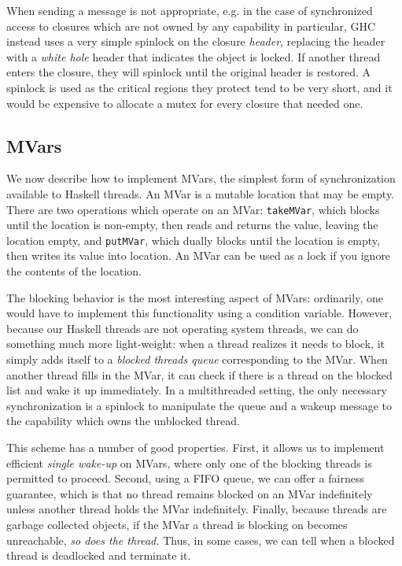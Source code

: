 When sending a message is not appropriate, e.g. in the case of
synchronized access to closures which are not owned by any capability in
particular, GHC instead uses a very simple spinlock on the closure
\emph{header}, replacing the header with a \emph{white hole} header that
indicates the object is locked.  If another thread enters the closure,
they will spinlock until the original header is restored.  A spinlock is
used as the critical regions they protect tend to be very short, and it would
be expensive to allocate a mutex for every closure that needed one.

\subsection{MVars}

We now describe how to implement MVars, the simplest form of
synchronization available to Haskell threads.  An MVar is a mutable
location that may be empty.  There are two operations which operate on
an MVar: \verb|takeMVar|, which blocks until the location is non-empty,
then reads and returns the value, leaving the location empty, and
\verb|putMVar|, which dually blocks until the location is empty, then
writes its value into location.  An MVar can be used as a lock if you
ignore the contents of the location.

The blocking behavior is the most interesting aspect of MVars:
ordinarily, one would have to implement this functionality using a
condition variable.  However, because our Haskell threads are not
operating system threads, we can do something much more light-weight:
when a thread realizes it needs to block, it simply adds itself to a
\emph{blocked threads queue} corresponding to the MVar.  When another
thread fills in the MVar, it can check if there is a thread on the
blocked list and wake it up immediately.  In a multithreaded setting,
the only necessary synchronization is a spinlock to manipulate the queue
and a wakeup message to the capability which owns the unblocked thread.

This scheme has a number of good properties.  First, it allows us
to implement efficient \emph{single wake-up} on MVars, where only one of
the blocking threads is permitted to proceed. Second, using a FIFO
queue, we can offer a fairness guarantee, which is that no thread
remains blocked on an MVar indefinitely unless another thread holds the
MVar indefinitely.  Finally, because threads are garbage collected
objects, if the MVar a thread is blocking on becomes unreachable,
\emph{so does the thread.}  Thus, in some cases, we can tell when
a blocked thread is deadlocked and terminate it.

